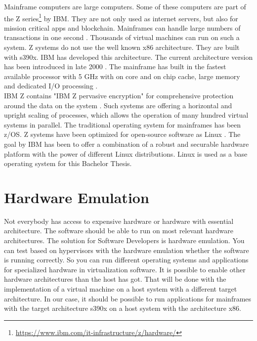 Mainframe computers are large computers. Some of these computers are part of the Z series\footnote{\url{https://www.ibm.com/it-infrastructure/z/hardware/}} by IBM. They are not only used as internet servers, but also for mission critical apps and blockchain. 
Mainframes can handle large numbers of transactions in one second \cite[~p.56]{Tanenbaum2014}. 
Thousands of virtual machines can run on such a system. Z systems do not use the well known x86 architecture. 
They are built with s390x. IBM has developed this architecture. The current architecture version has been introduced in late 2000 \cite[~p.15]{Block2019}. The mainframe has built in the fastest available processor with 5 GHz with on core and on chip cache, large memory and dedicated I/O processing \cite{OpenMainframeProject}.\\
IBM Z contains "IBM Z pervasive encryption" for comprehensive protection around the data on the system \cite[~p.4]{Lascu2020}. Such systems are offering a horizontal and upright \gls{scaling} of processes, which allows the operation of many hundred virtual systems in parallel\cite[~p.13]{Tschoeke2009}. The traditional operating system for mainframes has been z/OS. 
Z systems have been optimized for open-source software as Linux \cite[~p.8]{Lascu2020}. The goal by IBM has been to offer a combination of a robust and securable hardware platform with the power of different Linux distributions. 
Linux is used as a base operating system for this Bachelor Thesis.


\section{Hardware Emulation}

Not everybody has access to expensive hardware or hardware with essential architecture. The software should be able to run on most relevant hardware architectures. The solution for Software Developers is hardware emulation. 
You can test based on hypervisors with the hardware emulation whether the software is running correctly. 
So you can run different operating systems and applications for specialized hardware in virtualization software. 
It is possible to enable other hardware architectures than the host has got. 
That will be done with the implementation of a \gls{virtual machine} on a host system with a different target architecture\cite[~p.3]{Rosenthal2015}. In our case, it should be possible to run applications for mainframes with the target
architecture s390x on a host system with the architecture x86.


